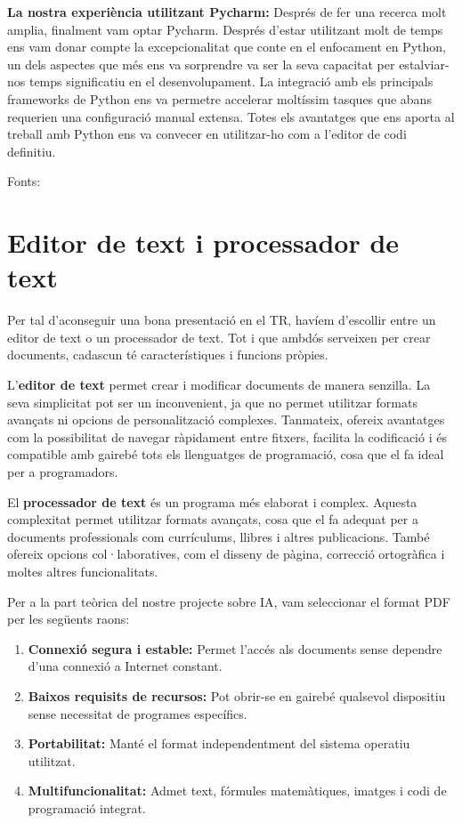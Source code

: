 \textbf{La nostra experiència utilitzant Pycharm:}
Després de fer una recerca molt amplia, finalment vam optar Pycharm. Després d'estar utilitzant molt de temps ens vam donar compte la excepcionalitat que conte en el enfocament en Python, un dels aspectes que més ens va sorprendre va ser la seva capacitat per estalviar-nos temps significatiu en el desenvolupament. La integració amb els principals frameworks de Python ens va permetre accelerar moltíssim tasques que abans requerien una configuració manual extensa.  Totes els avantatges que ens aporta al treball amb Python ens va convecer en utilitzar-ho com a l'editor de codi definitiu.


Fonts: \cite{VSCodeilessevesavantatges} \cite{FundacioEclipse} \cite{Totl'hoquehasdesaberdelPycharm} \cite{ToteslesnovetatsdePycharm}



\section{Editor de text i processador de text}\label{sec:4.2}

Per tal d'aconseguir una bona presentació en el TR, havíem d’escollir entre un editor de text o un processador de text. Tot i que ambdós serveixen per crear documents, cadascun té característiques i funcions pròpies.

L’\textbf{editor de text} permet crear i modificar documents de manera senzilla. La seva simplicitat pot ser un inconvenient, ja que no permet utilitzar formats avançats ni opcions de personalització complexes. Tanmateix, ofereix avantatges com la possibilitat de navegar ràpidament entre fitxers, facilita la codificació i és compatible amb gairebé tots els llenguatges de programació, cosa que el fa ideal per a programadors.

El \textbf{processador de text} és un programa més elaborat i complex. Aquesta complexitat permet utilitzar formats avançats, cosa que el fa adequat per a documents professionals com currículums, llibres i altres publicacions. També ofereix opcions col·laboratives, com el disseny de pàgina, correcció ortogràfica i moltes altres funcionalitats.

Per a la part teòrica del nostre projecte sobre IA, vam seleccionar el format PDF per les següents raons:
\begin{enumerate}
\item \textbf{Connexió segura i estable:} Permet l’accés als documents sense dependre d’una connexió a Internet constant.
\item \textbf{Baixos requisits de recursos:} Pot obrir-se en gairebé qualsevol dispositiu sense necessitat de programes específics.
\item \textbf{Portabilitat:} Manté el format independentment del sistema operatiu utilitzat.
\item \textbf{Multifuncionalitat:} Admet text, fórmules matemàtiques, imatges i codi de programació integrat.
\end{enumerate}

